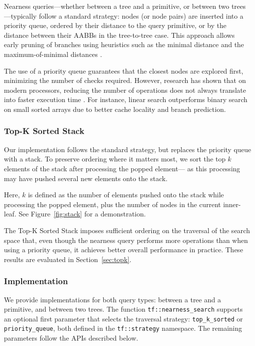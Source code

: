 Nearness queries---whether between a tree and a
primitive, or between two trees---typically follow a
standard strategy: nodes (or node pairs) are inserted
into a priority queue, ordered by their distance to the
query primitive, or by the distance between their AABBs
in the tree-to-tree case. This approach allows early
pruning of branches using heuristics such as the minimal
distance and the maximum-of-minimal distances
\cite{knn0, eknn}.

The use of a priority queue guarantees that the closest
nodes are explored first, minimizing the number of checks
required. However, research has shown that on modern
processors, reducing the number of operations does not
always translate into faster execution time
\cite{alexandrescu-sorting}. For instance, linear search
outperforms binary search on small sorted arrays due to
better cache locality and branch prediction.

\subsubsection{Top-K Sorted Stack}\label{sec:top-k}

Our implementation follows the standard strategy,
but replaces the priority queue with a stack. To preserve
ordering where it matters most, we sort the top $k$ elements
of the stack after processing the popped element—
as this processing may have pushed several new elements
onto the stack.

Here, $k$ is defined as the number of elements pushed onto the
stack while processing the popped element, plus the number
of nodes in the current inner-leaf. See Figure~\ref{fig:stack}
for a demonstration.


The Top-K Sorted Stack imposes sufficient ordering on the
traversal of the search space that, even though the nearness
query performs more operations than when using a
priority queue, it achieves better overall performance in
practice. These results are evaluated in
Section~\ref{sec:topk}.

\subsubsection{Implementation}

We provide implementations for both query types:
between a tree and a primitive, and between two trees.
The function \texttt{tf::nearness\_search} supports an
optional first parameter that selects the traversal
strategy: \texttt{top\_k\_sorted} or \texttt{priority\_queue},
both defined in the \texttt{tf::strategy} namespace.
The remaining parameters follow the APIs described below.


